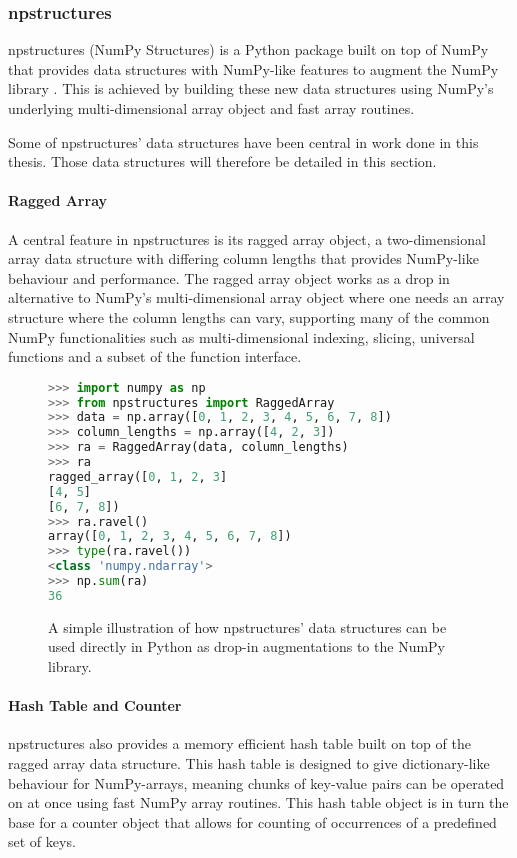 \subsubsection{npstructures} \label{background:implementation_tools_and_libraries:npstructures}
npstructures (NumPy Structures) is a Python package built on top of NumPy that provides data structures with NumPy-like features to augment the NumPy library \cite{npstructures}.
This is achieved by building these new data structures using NumPy's underlying multi-dimensional array object and fast array routines.

Some of npstructures' data structures have been central in work done in this thesis.
Those data structures will therefore be detailed in this section.

\paragraph{Ragged Array}
A central feature in npstructures is its ragged array object, a two-dimensional array data structure with differing column lengths that provides NumPy-like behaviour and performance.
The ragged array object works as a drop in alternative to NumPy's multi-dimensional array object where one needs an array structure where the column lengths can vary, supporting many of the common NumPy functionalities such as multi-dimensional indexing, slicing, universal functions and a subset of the function interface.
\begin{figure}[H]
\begin{lstlisting}[language=Python,style=console]
>>> import numpy as np
>>> from npstructures import RaggedArray
>>> data = np.array([0, 1, 2, 3, 4, 5, 6, 7, 8])
>>> column_lengths = np.array([4, 2, 3])
>>> ra = RaggedArray(data, column_lengths)
>>> ra
ragged_array([0, 1, 2, 3]
[4, 5]
[6, 7, 8])
>>> ra.ravel()
array([0, 1, 2, 3, 4, 5, 6, 7, 8])
>>> type(ra.ravel())
<class 'numpy.ndarray'>
>>> np.sum(ra)
36
\end{lstlisting}
\caption{
  A simple illustration of how npstructures' data structures can be used directly in Python as drop-in augmentations to the NumPy library.
}
\label{background:implementation_tools_and_libraries:npstructures:figure:ragged_array_example}
\end{figure}

\paragraph{Hash Table and Counter}
npstructures also provides a memory efficient hash table built on top of the ragged array data structure.
This hash table is designed to give dictionary-like behaviour for NumPy-arrays, meaning chunks of key-value pairs can be operated on at once using fast NumPy array routines.
This hash table object is in turn the base for a counter object that allows for counting of occurrences of a predefined set of keys.

